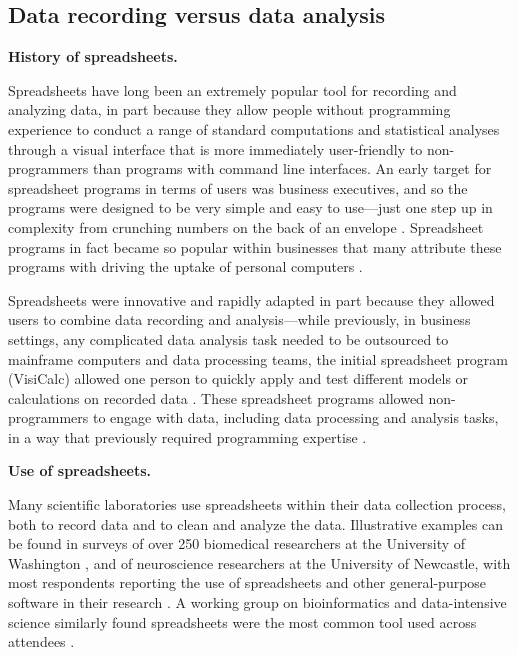 \documentclass[]{tufte-book}
\begin{document}
\hypertarget{data-recording-versus-data-analysis}{%
\subsection{Data recording versus data analysis}\label{data-recording-versus-data-analysis}}

\textbf{History of spreadsheets.}

Spreadsheets have long been an extremely popular tool for recording and
analyzing data, in part because they allow people without programming experience
to conduct a range of standard computations and statistical analyses through a
visual interface that is more immediately user-friendly to non-programmers than
programs with command line interfaces. An early target for spreadsheet programs
in terms of users was business executives, and so the programs were designed to
be very simple and easy to use---just one step up in complexity from crunching
numbers on the back of an envelope \citep{campbell2007number}. Spreadsheet programs
in fact became so popular within businesses that many attribute these programs
with driving the uptake of personal computers \citep{campbell2007number}.

Spreadsheets were innovative and rapidly adapted in part because they allowed
users to combine data recording and analysis---while previously, in business
settings, any complicated data analysis task needed to be outsourced to
mainframe computers and data processing teams, the initial spreadsheet program
(VisiCalc) allowed one person to quickly apply and test different models or
calculations on recorded data \citep{levy1984spreadsheet}. These spreadsheet programs
allowed non-programmers to engage with data, including data processing and
analysis tasks, in a way that previously required programming expertise
\citep{levy1984spreadsheet}.

\textbf{Use of spreadsheets.}

Many scientific laboratories use spreadsheets within their data collection
process, both to record data and to clean and analyze the data. Illustrative
examples can be found in surveys of over 250 biomedical researchers at the University
of Washington \citep{anderson2007issues}, and of neuroscience researchers at the
University of Newcastle, with most respondents reporting the use of spreadsheets
and other general-purpose software in their research \citep{altarawneh2017pilot}.
A working group on bioinformatics and data-intensive science similarly found
spreadsheets were the most common tool used across attendees
\citep{barga2011bioinformatics}.
\end{document}
